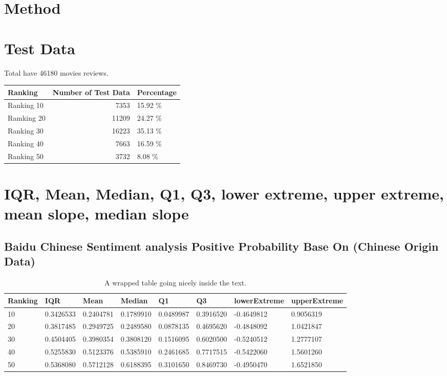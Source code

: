 \documentclass[conference]{IEEEtran}
\begin{document}
\section{Method}
\section{Test Data}
Total have 46180 movies reviews.
\begin{tabular}{lrl}
Ranking & Number of Test Data & Percentage\\
\hline
Ranking 10 & 7353 & 15.92 \%\\
Ramking 20 & 11209 & 24.27 \%\\
Ranking 30 & 16223 & 35.13 \%\\
Ranking 40 & 7663 & 16.59 \%\\
Ranking 50 & 3732 & 8.08 \%\\
\end{tabular}

\section{IQR, Mean, Median, Q1, Q3, lower extreme, upper extreme, mean slope, median slope}
\subsection{Baidu Chinese Sentiment analysis Positive Probability Base On
  (Chinese Origin Data)}
\begin{wraptable}{r}{0.5\textwidth}
\caption{A wrapped table going nicely inside the text.}\label{wrap-tab:1}
\begin{tabularx}{\textwidth}{ |X|X|X|X|X|X|X|X }
Ranking & IQR & Mean & Median & Q1 & Q3 & lowerExtreme & upperExtreme\\
\hline
10 & 0.3426533 & 0.2404781 & 0.1789910 & 0.0489987 & 0.3916520 & -0.4649812 & 0.9056319\\
20 & 0.3817485 & 0.2949725 & 0.2489580 & 0.0878135 & 0.4695620 & -0.4848092 & 1.0421847\\
30 & 0.4504405 & 0.3980354 & 0.3808120 & 0.1516095 & 0.6020500 & -0.5240512 & 1.2777107\\
40 & 0.5255830 & 0.5123376 & 0.5385910 & 0.2461685 & 0.7717515 & -0.5422060 & 1.5601260\\
50 & 0.5368080 & 0.5712128 & 0.6188395 & 0.3101650 & 0.8469730 & -0.4950470 & 1.6521850\\
\end{tabularx}
\end{wraptable}
\end{document}
